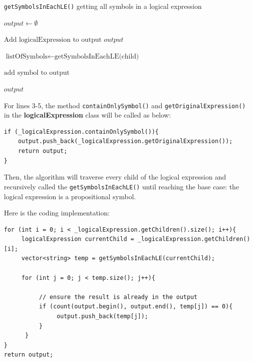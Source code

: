 \documentclass{assignment}
\begin{document}
\begin{algorithm}
\caption{\texttt{getSymbolsInEachLE()} getting all symbols in a logical expression}
\begin{algorithmic}[1]
    \State $output \gets \emptyset$
    
        \State $\text{Add logicalExpression to output}$
        \State \Return $output$
    \EndIf
    
        \State $\text{listOfSymbols} \gets \text{getSymbolsInEachLE(child)}$
        
                \State $\text{add symbol to output}$
            \EndIf
        \EndFor
    \EndFor
    
    \State \Return $output$
\EndFunction
\end{algorithmic}
\end{algorithm}

For lines 3-5, the method \texttt{containOnlySymbol()} and \texttt{getOriginalExpression()} in the \textbf{logicalExpression} class will be called as below:

\lstset{language=C++}
\begin{lstlisting}[caption={Coding for lines 3-5}]
if (_logicalExpression.containOnlySymbol()){
    output.push_back(_logicalExpression.getOriginalExpression());
    return output;
}
\end{lstlisting}

Then, the algorithm will traverse every child of the logical expression and recursively called the \texttt{getSymbolsInEachLE()} until reaching the base case: the logical expression is a propositional symbol.

Here is the coding implementation:
\lstset{language=C++}
\begin{lstlisting}[caption={Coding for lines 7-15}]
for (int i = 0; i < _logicalExpression.getChildren().size(); i++){
     logicalExpression currentChild = _logicalExpression.getChildren()[i];
     vector<string> temp = getSymbolsInEachLE(currentChild);

     for (int j = 0; j < temp.size(); j++){
            
          // ensure the result is already in the output
          if (count(output.begin(), output.end(), temp[j]) == 0){
               output.push_back(temp[j]);
          }
      }
}
return output;
\end{lstlisting}
\end{document}
